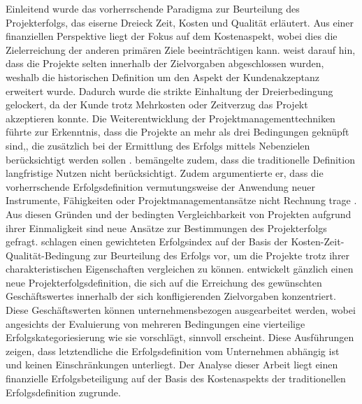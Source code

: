 \newline\newline
Einleitend wurde das vorherrschende Paradigma zur Beurteilung des Projekterfolgs, das eiserne Dreieck Zeit, Kosten und Qualität erläutert. Aus einer finanziellen Perspektive liegt der Fokus auf dem Kostenaspekt, wobei dies die Zielerreichung der anderen primären Ziele beeinträchtigen kann. \citealp[S.~40]{kerz14} weist darauf hin, dass die Projekte selten innerhalb der Zielvorgaben abgeschlossen wurden, weshalb die historischen Definition um den Aspekt der Kundenakzeptanz erweitert wurde. Dadurch wurde die strikte Einhaltung der Dreierbedingung gelockert, da der Kunde trotz Mehrkosten oder Zeitverzug das Projekt akzeptieren konnte. Die Weiterentwicklung der Projektmanagementtechniken führte zur Erkenntnis, dass die Projekte an mehr als drei Bedingungen geknüpft sind,, die zusätzlich bei der Ermittlung des Erfolgs mittels Nebenzielen berücksichtigt werden sollen \citep[S.~41]{kerz14}. \citealp{Atk1999} bemängelte zudem, dass die traditionelle Definition langfristige Nutzen nicht berücksichtigt. Zudem argumentierte er, dass die vorherrschende Erfolgsdefinition vermutungsweise der Anwendung neuer Instrumente, Fähigkeiten oder Projektmanagementansätze nicht Rechnung trage \citep{Atk1999}. Aus diesen Gründen und der bedingten Vergleichbarkeit von Projekten aufgrund ihrer Einmaligkeit sind neue Ansätze zur Bestimmungen des Projekterfolgs gefragt. \citep{lchch08} schlagen einen gewichteten Erfolgsindex auf der Basis der Kosten-Zeit-Qualität-Bedingung zur Beurteilung des Erfolgs vor, um die Projekte trotz ihrer charakteristischen Eigenschaften vergleichen zu können. \citep{kerz14} entwickelt gänzlich einen neue Projekterfolgsdefinition, die sich auf die Erreichung des gewünschten Geschäftswertes innerhalb der sich konfligierenden Zielvorgaben konzentriert. Diese Geschäftswerten können unternehmensbezogen ausgearbeitet werden, wobei angesichts der Evaluierung von mehreren Bedingungen eine vierteilige Erfolgskategoriesierung wie sie \citealp[S.~48]{kerz14} vorschlägt, sinnvoll erscheint. Diese Ausführungen zeigen, dass letztendliche die Erfolgsdefinition vom Unternehmen abhängig ist und keinen Einschränkungen unterliegt. Der Analyse dieser Arbeit liegt einen finanzielle Erfolgsbeteiligung auf der Basis des Kostenaspekts der traditionellen Erfolgsdefinition zugrunde.
\newline\newline
